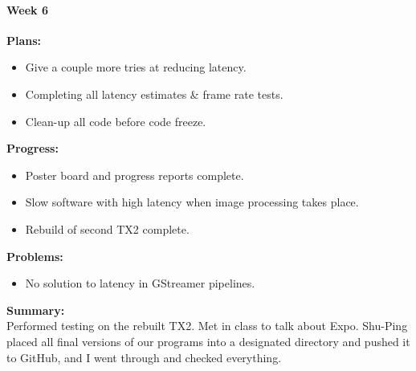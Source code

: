 \paragraph{Week 6}
\begin{adjustwidth}{2.5em}{0pt}
    \vspace{-0.5cm}\textbf{Plans:}
    \vspace{-0.5cm}
    \begin{itemize}
        \item Give a couple more tries at reducing latency.
		\item Completing all latency estimates \& frame rate tests.
		\item Clean-up all code before code freeze.
    \end{itemize} 
    \vspace{-0.3cm}\textbf{Progress:}
    \vspace{-0.5cm}
    \begin{itemize}
        \item Poster board and progress reports complete.
		\item Slow software with high latency when image processing takes place. 
		\item Rebuild of second TX2 complete. 
    \end{itemize} 
    \vspace{-0.3cm}\textbf{Problems:}
    \vspace{-0.5cm}
    \begin{itemize}
        \item No solution to latency in GStreamer pipelines.
    \end{itemize}  
    \vspace{-0.3cm}\noindent\textbf{Summary:}\\
    \noindent Performed testing on the rebuilt TX2. Met in class to talk about Expo. Shu-Ping placed all final versions of our programs into a designated directory and pushed it to GitHub, and I went through and checked everything.
\end{adjustwidth} 

